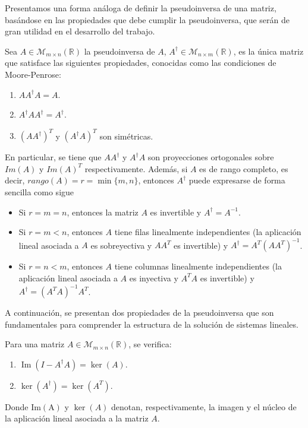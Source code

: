 Presentamos una forma análoga de definir la pseudoinversa de una matriz, basándose en las propiedades que debe cumplir la pseudoinversa, que serán de gran utilidad en el desarrollo del trabajo.
\begin{definicion}
    Sea $A \in \mathcal{M}_{m \times n}(\mathbb{R})$ la pseudoinversa de $A$, $A^{\dagger} \in \mathcal{M}_{n \times m}(\mathbb{R})$, es la única matriz que satisface las siguientes propiedades, conocidas como las condiciones de Moore-Penrose:

    \begin{enumerate}
        \item $A A^{\dagger} A = A$.
        \item $A^{\dagger} A A^{\dagger} = A^{\dagger}$.
        \item ${(A A^{\dagger})}^{T}$ y ${(A^{\dagger} A)}^{T}$ son simétricas.
    \end{enumerate}

    En particular, se tiene que $AA^{\dagger}$ y $A^{\dagger}A$ son proyecciones ortogonales sobre $Im(A)$ y ${Im(A)}^{T}$ respectivamente. Además, si $A$ es de rango completo, es decir, $rango(A) = r  = \min\{m, n\}$, entonces $A^{\dagger}$ puede expresarse de forma sencilla como sigue

    \begin{itemize}
        \item Si $r = m = n$, entonces la matriz $A$ es invertible y $A^{\dagger} = A^{-1}$.
        \item Si $r = m < n$, entonces $A$ tiene filas linealmente independientes (la aplicación lineal asociada a $A$ es sobreyectiva y $AA^{T}$ es invertible) y $A^{\dagger} = A^{T}{(AA^{T})}^{-1}$.
        \item Si $r = n < m$, entonces $A$ tiene columnas linealmente independientes (la aplicación lineal asociada a $A$ es inyectiva y $A^{T}A$ es invertible) y $A^{\dagger} = {(A^{T}A)}^{-1} A^{T}$.
    \end{itemize}
\end{definicion}

A continuación, se presentan dos propiedades de la pseudoinversa que son fundamentales para comprender la estructura de la solución de sistemas lineales.

\begin{lema}\label{lema:propiedades-pseudoinversa}
    Para una matriz $A \in \mathcal{M}_{m \times n}(\mathbb{R})$, se verifica:

    \begin{enumerate}
        \item $\operatorname{Im}(I-A^{\dagger}A) = \ker(A)$.
        \item $\ker(A^{\dagger}) = \ker(A^{T})$.
    \end{enumerate}

    Donde $\operatorname{Im(A)}$ y $\ker(A)$ denotan, respectivamente, la imagen y el núcleo de la aplicación lineal asociada a la matriz $A$.
\end{lema}


